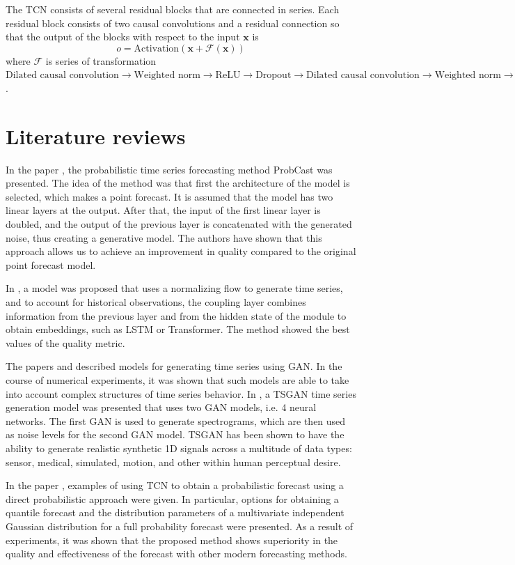 \documentclass[12pt,a4paper]{article}
\begin{document}
The TCN consists of several residual blocks that are connected in series. Each residual block consists of two causal convolutions and a residual connection so that the output of the blocks with respect to the input $\mathbf x$ is
$$o=\text {Activation}(\mathbf{x}+\mathcal{F}(\mathbf{x}))$$
where $\mathcal F$ is series of transformation $\text{Dilated causal convolution} \to \text{Weighted norm} \to \text{ReLU} \to \text{Dropout} \to \text{Dilated causal convolution} \to \text{Weighted norm} \to \text{ReLU} \to \text{Dropout}$.

\section{Literature reviews}

In the paper \cite{koochali2020like}, the probabilistic time series forecasting method ProbCast was presented. The idea of the method was that first the architecture of the model is selected, which makes a point forecast. It is assumed that the model has two linear layers at the output. After that, the input of the first linear layer is doubled, and the output of the previous layer is concatenated with the generated noise, thus creating a generative model. The authors have shown that this approach allows us to achieve an improvement in quality compared to the original point forecast model.

In \cite{normflow2021}, a model was proposed that uses a normalizing flow to generate time series, and to account for historical observations, the coupling layer combines information from the previous layer and from the hidden state of the module to obtain embeddings, such as LSTM or Transformer. The method showed the best values of the quality metric.

The papers \cite{quantgan2020} and \cite{tsgan} described models for generating time series using GAN. In the course of numerical experiments, it was shown that such models are able to take into account complex structures of time series behavior. In \cite{cganforts}, a TSGAN time series generation model was presented that uses two GAN models, i.e. 4 neural networks. The first GAN is used to generate spectrograms, which are then used as noise levels for the second GAN model. TSGAN has been shown to have the ability to generate realistic synthetic 1D signals across a multitude of data types: sensor, medical, simulated, motion, and other within human perceptual desire.

In the paper \cite{gaussiantcn2020}, examples of using TCN to obtain a probabilistic forecast using a direct probabilistic approach were given. In particular, options for obtaining a quantile forecast and the distribution parameters of a multivariate independent Gaussian distribution for a full probability forecast were presented. As a result of experiments, it was shown that the proposed method shows superiority in the quality and effectiveness of the forecast with other modern forecasting methods.
\end{document}
